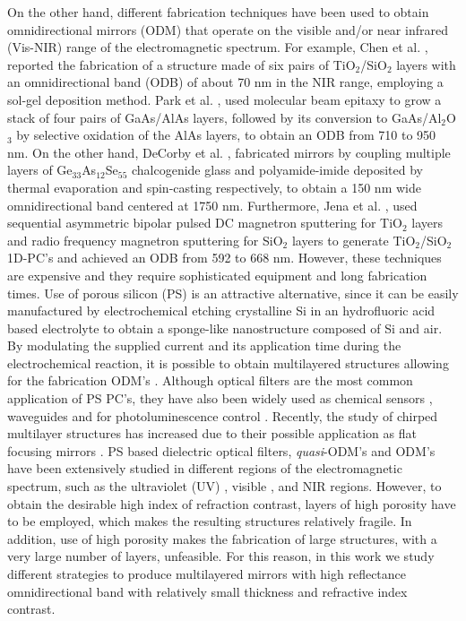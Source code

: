 \documentclass[a4paper,fleqn]{cas-sc}
\begin{document}
On the other hand, different fabrication techniques have been used to
obtain omnidirectional mirrors (ODM) that operate on the visible and/or
near infrared (Vis-NIR) range of the electromagnetic spectrum. For
example, Chen et al. \cite{Chen1999},
reported the fabrication of a structure made of six pairs of
TiO$_{2}$/SiO$_{2}$  layers with
an omnidirectional band (ODB) of about 70 nm in the NIR range, employing a sol-gel deposition
method. Park et al. \cite{Park2003}, used molecular beam epitaxy to
grow a stack of four pairs of GaAs/AlAs layers, followed by its conversion to
GaAs/Al$_{2}$O$_{3}$ by selective oxidation of the AlAs
layers, to obtain an ODB from 710 to 950 nm.
On the other hand, DeCorby et al. \cite{DeCorby2005}, fabricated mirrors by
coupling multiple layers of Ge$_{33}$As$_{12}$Se$_{55}$ chalcogenide glass and
polyamide-imide deposited by thermal evaporation and spin-casting
respectively, to obtain a 150 nm wide omnidirectional band centered at
1750 nm. Furthermore, Jena et al. \cite{Jena2019},
used sequential asymmetric bipolar pulsed DC magnetron sputtering for TiO$%
_{2}$ layers and radio frequency magnetron sputtering for SiO$_{2}$
layers to generate TiO$_{2}$/SiO$_{2}$ 1D-PC's and achieved an ODB from
592 to 668 nm. However, these techniques are expensive and they
require sophisticated equipment and long fabrication times. Use of
porous silicon (PS)
is an attractive alternative, since it can be easily manufactured by
electrochemical etching crystalline Si in an hydrofluoric
acid based electrolyte to obtain a sponge-like nanostructure composed
of Si and air. By modulating the supplied current and its application
time during the electrochemical reaction, it is possible to obtain
multilayered structures allowing for the fabrication ODM's \cite{Xifre2015,Pavesi2000}.
Although optical filters \cite{Estevez2009,Ariza2014} are the most common
application of PS PC's, they have also been widely used as chemical
sensors \cite{Giusseppe2011,Agarwal2018}, waveguides \cite{Hussel1997} and
for photoluminescence control \cite{Antunez2014}. Recently, the study of
chirped multilayer structures has
increased due to their possible application as flat focusing mirrors
\cite{Wu2021,Kozar2017,Cheng2018}.
PS based dielectric optical filters, {\em quasi}-ODM's and ODM's have
been extensively studied in different
regions of the electromagnetic spectrum, such as the ultraviolet (UV)
\cite{Jimenez2020}, visible \cite{Ariza2012}, and NIR \cite{Bruyant2003} regions.
However, to obtain the desirable high index of refraction
contrast, layers of high porosity have to be employed, which makes the
resulting structures relatively fragile. In addition, use of high
porosity makes the fabrication of large structures, with a
very large number of layers, unfeasible. For this reason, in this work
we study different strategies to produce multilayered mirrors
with high reflectance omnidirectional band
with relatively small thickness and refractive index contrast.
\end{document}
